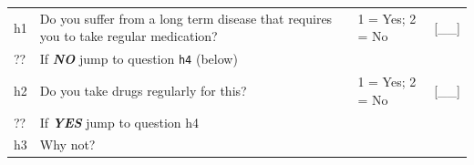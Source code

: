 \documentclass[12pt,a4paper]{book}
\theoremstyle{definition}
\theoremstyle{definition}
\theoremstyle{definition}
\theoremstyle{remark}
\begin{document}
\begin{longtable}[]{@{}llll@{}}
\toprule
\begin{minipage}[t]{0.09\columnwidth}\raggedright
h1\strut
\end{minipage} & \begin{minipage}[t]{0.41\columnwidth}\raggedright
Do you suffer from a long term disease that requires you to take regular
medication?\strut
\end{minipage} & \begin{minipage}[t]{0.25\columnwidth}\raggedright
1 = Yes; 2 = No\strut
\end{minipage} & \begin{minipage}[t]{0.13\columnwidth}\raggedright
{[}\_\_{]}\strut
\end{minipage}\tabularnewline
\begin{minipage}[t]{0.09\columnwidth}\raggedright
??\strut
\end{minipage} & \begin{minipage}[t]{0.41\columnwidth}\raggedright
If \textbf{\emph{NO}} jump to question \texttt{h4} (below)\strut
\end{minipage} & \begin{minipage}[t]{0.25\columnwidth}\raggedright
\strut
\end{minipage} & \begin{minipage}[t]{0.13\columnwidth}\raggedright
\strut
\end{minipage}\tabularnewline
\begin{minipage}[t]{0.09\columnwidth}\raggedright
h2\strut
\end{minipage} & \begin{minipage}[t]{0.41\columnwidth}\raggedright
Do you take drugs regularly for this?\strut
\end{minipage} & \begin{minipage}[t]{0.25\columnwidth}\raggedright
1 = Yes; 2 = No\strut
\end{minipage} & \begin{minipage}[t]{0.13\columnwidth}\raggedright
{[}\_\_{]}\strut
\end{minipage}\tabularnewline
\begin{minipage}[t]{0.09\columnwidth}\raggedright
??\strut
\end{minipage} & \begin{minipage}[t]{0.41\columnwidth}\raggedright
If \textbf{\emph{YES}} jump to question h4\strut
\end{minipage} & \begin{minipage}[t]{0.25\columnwidth}\raggedright
\strut
\end{minipage} & \begin{minipage}[t]{0.13\columnwidth}\raggedright
\strut
\end{minipage}\tabularnewline
\begin{minipage}[t]{0.24\columnwidth}\raggedright
h3\strut
\end{minipage} & \begin{minipage}[t]{0.24\columnwidth}\raggedright
Why not?


\end{minipage}
\end{longtable}
\end{document}
